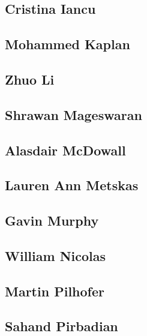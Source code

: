 \documentclass[]{tufte-book}
\begin{document}
\hypertarget{cristina_iancu}{\subsection{Cristina
Iancu}\label{cristina_iancu}}

\hypertarget{mohammed_kaplan}{\subsection{Mohammed
Kaplan}\label{mohammed_kaplan}}

\hypertarget{zhuo_li}{\subsection{Zhuo Li}\label{zhuo_li}}

\hypertarget{shrawan_mageswaran}{\subsection{Shrawan
Mageswaran}\label{shrawan_mageswaran}}

\hypertarget{alasdair_mcdowall}{\subsection{Alasdair
McDowall}\label{alasdair_mcdowall}}

\hypertarget{lauren_ann_metskas}{\subsection{Lauren Ann
Metskas}\label{lauren_ann_metskas}}

\hypertarget{gavin_murphy}{\subsection{Gavin
Murphy}\label{gavin_murphy}}

\hypertarget{william_nicolas}{\subsection{William
Nicolas}\label{william_nicolas}}

\hypertarget{martin_pilhofer}{\subsection{Martin
Pilhofer}\label{martin_pilhofer}}

\hypertarget{sahand_pirbadian}{\subsection{Sahand
Pirbadian}\label{sahand_pirbadian}}
\end{document}
